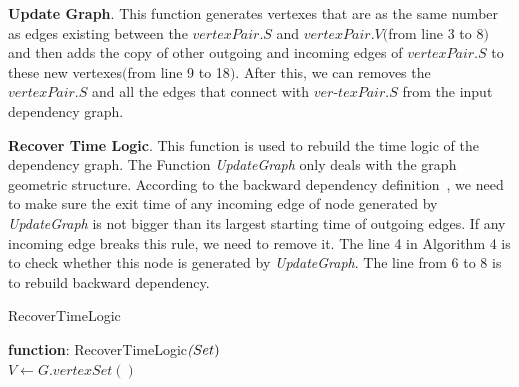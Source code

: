 \textbf{Update Graph}.
This function generates vertexes that are as the same number as edges existing between the $vertexPair.S$ and $vertexPair.V$$($from line 3 to 8$)$ and then adds the copy of other outgoing and incoming edges of $vertexPair.S$ to these new vertexes$($from line 9 to 18$)$. After this, we can removes the $vertexPair.S$ and all the edges that connect with $ver$-$texPair.S$ from the input dependency graph.

\textbf{Recover Time Logic}.
This function is used to rebuild the time logic of the dependency graph. The Function \textit{UpdateGraph} only deals with the graph geometric structure. According to the backward dependency definition~\cite{backtracking,backtrackingfile,backtracking2}, we need to make sure the exit time of any incoming edge of node generated by \textit{UpdateGraph} is not bigger than its largest starting time of outgoing edges. If any incoming edge breaks this rule, we need to remove it. The line 4 in Algorithm 4 is to check whether this node is generated by \textit{UpdateGraph}. The line from 6 to 8 is to rebuild backward dependency.  

\begin{algorithm}[b]
	\caption{RecoverTimeLogic}
	\textbf{function}: RecoverTimeLogic$\textit(Set)$\\
	$V \leftarrow G.vertexSet()$\;
	\label{alg:recover} 	
\end{algorithm}

